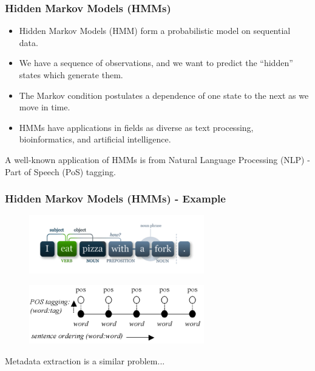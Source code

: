 \documentclass{beamer}
\begin{document}
\begin{frame}
\frametitle{Hidden Markov Models (HMMs)}
\begin{itemize}
\item Hidden Markov Models (HMM) form a probabilistic model on sequential data.
\item We have a sequence of observations, and we want to predict the ``hidden'' states which generate them.
\item The Markov condition postulates a dependence of one state to the next as we move in time.
\item HMMs have applications in fields as diverse as text processing, bioinformatics, and artificial intelligence.
\end{itemize}
\end{frame}


\begin{frame}
A well-known application of HMMs is from Natural Language Processing (NLP) - Part of Speech (PoS) tagging.
\frametitle{Hidden Markov Models (HMMs) - Example}
\begin{figure}[!ht]
\center
\includegraphics[width=3in]{figures/pos1.pdf}
\end{figure}

\begin{figure}[!ht]
\center
\includegraphics[width=3in]{figures/pos2.png}
\end{figure}
Metadata extraction is a similar problem...
\end{frame}

\end{document}
